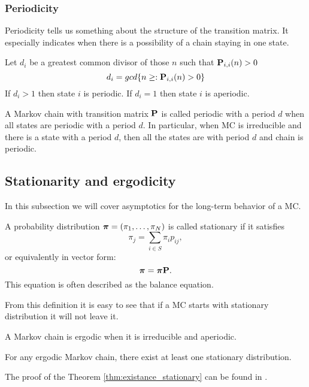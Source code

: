 	\subsubsection{Periodicity}
		Periodicity tells us something about the structure of the transition matrix. It especially indicates when there is a possibility of a chain staying in one state.
		\begin{definition}[Periodicity]
			Let $d_i$ be a greatest common divisor of those $n$ such that $\mathbf{P}_{i,i}(n)>0$ \ie
			\begin{equation*}
				d_i = gcd\{ n \geq : \mathbf{P}_{i,i}(n)>0 \}
			\end{equation*}
			If $d_i > 1$ then state $i$ is periodic. If $d_i = 1$ then state $i$ is aperiodic.
		\end{definition}
	
		\begin{definition}
			A Markov chain with transition matrix $\mathbf{P}$ is called periodic with a period $d$ when all states are periodic with a period $d$. In particular, when MC is irreducible and there is a state with a period $d$, then all the states are with period $d$ and chain is periodic.
		\end{definition}	
	

\subsection{Stationarity and ergodicity}
	In this subsection we will cover asymptotics for the long-term behavior of a MC.
	\begin{definition}[Stationarity]
		A probability distribution $\boldsymbol{\pi} = (\pi_1, \ldots, \pi_N)$ is called stationary if it satisfies
		\begin{equation*}
			\pi_j = \sum_{i \in S} \pi_i p_{ij},
		\end{equation*}
		or equivalently in vector form:
		\begin{equation*}
			\boldsymbol{\pi} = \boldsymbol{\pi} \mathbf{P}.
		\end{equation*}
		This equation is often described as the balance equation.
	\end{definition}
	From this definition it is easy to see that if a MC starts with stationary distribution it will not leave it. 
	
	\begin{definition}[Ergodicity]
		A Markov chain is ergodic when it is irreducible and aperiodic.
	\end{definition}
	
	\begin{theorem} \label{thm:existance_stationary}
		For any ergodic Markov chain, there exist at least one stationary distribution.
	\end{theorem}
	The proof of the Theorem \ref{thm:existance_stationary} can be found in \cite{haggstrom2002finite}.
	
